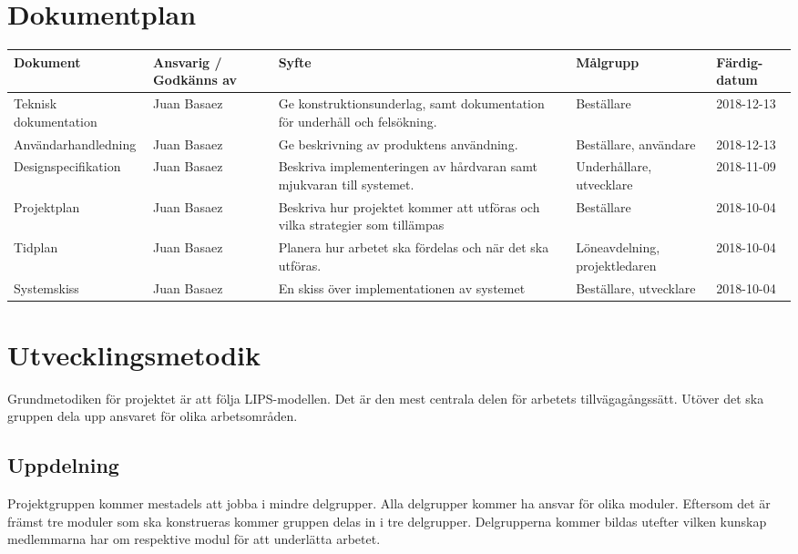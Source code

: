 \documentclass[projektplan/plan.tex]{subfiles}
\begin{document}
\section{Dokumentplan}
{\renewcommand{\arraystretch}{1.6}
\begin{longtable}{p{4.5cm}p{1.5cm}p{5cm}p{2.2cm}p{1.2cm}}
    \bfseries Dokument &
    \bfseries Ansvarig / Godkänns av &
    \bfseries Syfte &
    \bfseries Målgrupp &
    \bfseries Färdig-datum \\\hline
    Teknisk dokumentation &
    Juan Basaez &
    Ge konstruktionsunderlag, samt dokumentation för underhåll och
    felsökning. &
    Beställare &
    2018-12-13
    \\
    Användarhandledning &
    Juan Basaez &
    Ge beskrivning av produktens användning. &
    Beställare, användare &
    2018-12-13
    \\
    Designspecifikation &
    Juan Basaez &
    Beskriva implementeringen av hårdvaran samt mjukvaran till systemet. &
    Underhållare, utvecklare &
    2018-11-09
    \\
    Projektplan &
    Juan Basaez &
    Beskriva hur projektet kommer att utföras och vilka strategier som
    tillämpas &
    Beställare &
    2018-10-04
    \\
    Tidplan &
    Juan Basaez &
    Planera hur arbetet ska fördelas och när det ska utföras. &
    Löne\-avdelning, projekt\-ledaren &
    2018-10-04
    \\
    Systemskiss &
    Juan Basaez &
    En skiss över implementationen av systemet &
    Beställare, utvecklare &
    2018-10-04
    \\
    
    \endhead
\end{longtable}}
\newpage
\section{Utvecklingsmetodik}
Grundmetodiken för projektet är att följa LIPS-modellen. Det är den mest centrala delen för arbetets tillvägagångssätt. Utöver det ska gruppen dela upp ansvaret för olika arbetsområden.
\subsection{Uppdelning}
Projektgruppen kommer mestadels att jobba i mindre delgrupper. Alla delgrupper kommer ha ansvar för olika moduler. Eftersom det är främst tre moduler som ska konstrueras kommer gruppen delas in i tre delgrupper. Delgrupperna kommer bildas utefter vilken kunskap medlemmarna har om respektive modul för att underlätta arbetet.
\end{document}
